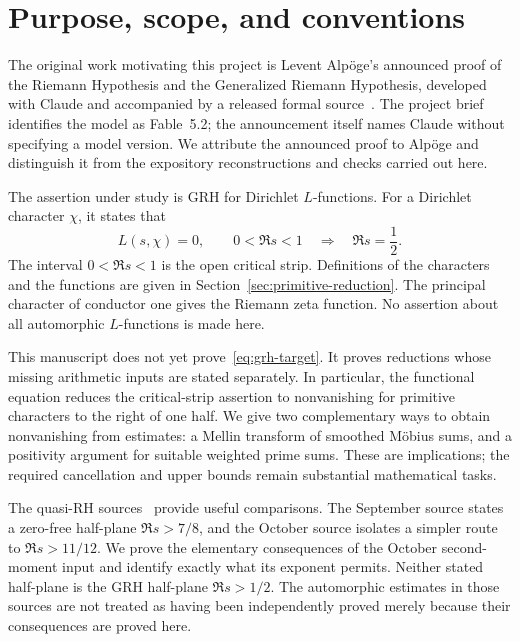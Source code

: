 \section{Purpose, scope, and conventions}
\label{sec:introduction}

The original work motivating this project is Levent Alp\"oge's announced
proof of the Riemann Hypothesis and the Generalized Riemann Hypothesis,
developed with Claude and accompanied by a released formal
source~\cite{Alpoge,AlpogeSource}. The project brief identifies the model as
Fable~5.2; the announcement itself names Claude without specifying a
model version. We attribute the announced proof to Alp\"oge and distinguish
it from the expository reconstructions and checks carried out here.

The assertion under study is GRH for Dirichlet $L$-functions. For a
Dirichlet character $\chi$, it states that
\begin{equation}\label{eq:grh-target}
 L(s,\chi)=0,\qquad 0<\Re s<1
 \quad\Longrightarrow\quad \Re s=\frac12.
\end{equation}
The interval $0<\Re s<1$ is the open critical strip. Definitions of the
characters and the functions are given in
Section~\ref{sec:primitive-reduction}. The principal character of conductor
one gives the Riemann zeta function. No assertion about all automorphic
$L$-functions is made here.

This manuscript does not yet prove~\eqref{eq:grh-target}. It proves
reductions whose missing arithmetic inputs are stated separately.
In particular, the functional equation reduces the critical-strip
assertion to nonvanishing for primitive characters to the right of
one half. We give two complementary ways to obtain nonvanishing from
estimates: a Mellin transform of smoothed M\"obius sums, and a positivity
argument for suitable weighted prime sums. These are implications;
the required cancellation and upper bounds remain substantial mathematical
tasks.

The quasi-RH sources~\cite{OpenAISeptember,OpenAIOctober} provide useful
comparisons. The September source states a zero-free half-plane
$\Re s>7/8$, and the October source isolates a simpler route to
$\Re s>11/12$. We prove the elementary consequences of the October
second-moment input and identify exactly what its exponent permits.
Neither stated half-plane is the GRH half-plane $\Re s>1/2$.
The automorphic estimates in those sources are not treated as having
been independently proved merely because their consequences are proved
here.

